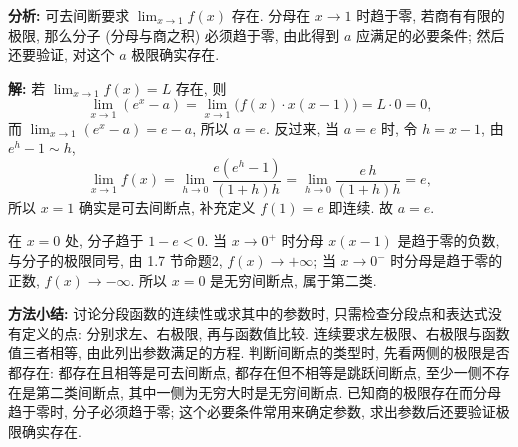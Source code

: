 \documentclass[UTF8,openany]{ctexbook}
\theoremstyle{chinesetextbook}
\newenvironment{cnsolution}{\par\indent\textbf{解:} \ignorespaces}{\par}
\begin{document}
\par\indent\textbf{分析:} 可去间断要求 $\displaystyle\lim_{x\to1}f(x)$ 存在. 分母在 $x\to1$ 时趋于零, 若商有有限的极限, 那么分子 (分母与商之积) 必须趋于零, 由此得到 $a$ 应满足的必要条件; 然后还要验证, 对这个 $a$ 极限确实存在.
\begin{cnsolution}
若 $\displaystyle\lim_{x\to1}f(x)=L$ 存在, 则
\[
\lim_{x\to1}(e^x-a)=\lim_{x\to1}\bigl(f(x)\cdot x(x-1)\bigr)=L\cdot0=0,
\]
而 $\displaystyle\lim_{x\to1}(e^x-a)=e-a$, 所以 $a=e$. 反过来, 当 $a=e$ 时, 令 $h=x-1$, 由 $e^h-1\sim h$,
\[
\lim_{x\to1}f(x)=\lim_{h\to0}\frac{e(e^h-1)}{(1+h)h}=\lim_{h\to0}\frac{e\,h}{(1+h)h}=e,
\]
所以 $x=1$ 确实是可去间断点, 补充定义 $f(1)=e$ 即连续. 故 $a=e$.

在 $x=0$ 处, 分子趋于 $1-e<0$. 当 $x\to0^+$ 时分母 $x(x-1)$ 是趋于零的负数, 与分子的极限同号, 由 1.7 节命题2, $f(x)\to+\infty$; 当 $x\to0^-$ 时分母是趋于零的正数, $f(x)\to-\infty$. 所以 $x=0$ 是无穷间断点, 属于第二类.
\end{cnsolution}
\par\indent\textbf{方法小结:} 讨论分段函数的连续性或求其中的参数时, 只需检查分段点和表达式没有定义的点: 分别求左、右极限, 再与函数值比较. 连续要求左极限、右极限与函数值三者相等, 由此列出参数满足的方程. 判断间断点的类型时, 先看两侧的极限是否都存在: 都存在且相等是可去间断点, 都存在但不相等是跳跃间断点, 至少一侧不存在是第二类间断点, 其中一侧为无穷大时是无穷间断点. 已知商的极限存在而分母趋于零时, 分子必须趋于零; 这个必要条件常用来确定参数, 求出参数后还要验证极限确实存在.
\end{document}
